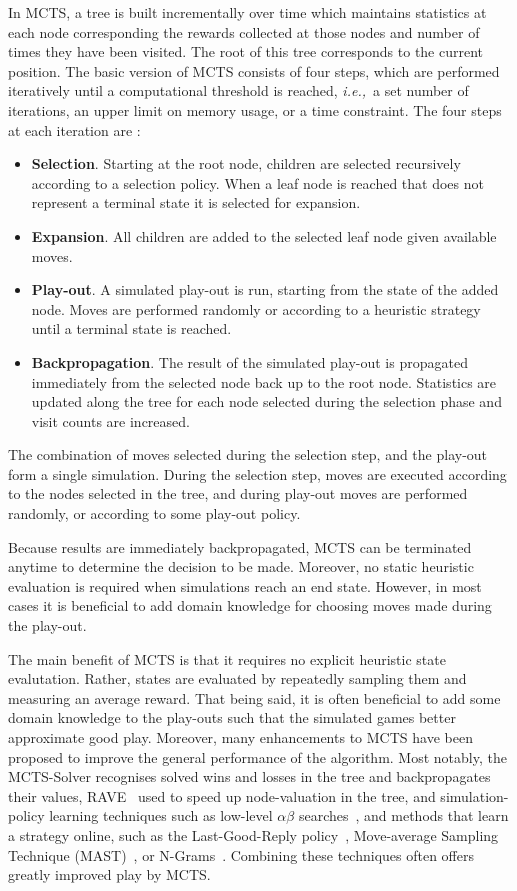 \documentclass{kecsmstr}
\newcommand{\ie}{{\it i.e.,}~}
\begin{document}
In MCTS, a tree is built incrementally over time which maintains statistics at each node corresponding the rewards collected at those nodes and number of times  they have been visited. The root of this tree corresponds to the current position. The basic version of MCTS consists of four steps, which are performed iteratively until a computational threshold is reached, \ie a set number of iterations, an upper limit on memory usage, or a time constraint. The four steps at each iteration are :
\begin{itemize}
\item {\bf Selection}. Starting at the root node, children are selected recursively according to a selection policy. When a leaf node is reached that does not represent a terminal state it is selected for expansion.
\item {\bf Expansion}. All children are added to the selected leaf node given available moves.
\item {\bf Play-out}. A simulated play-out is run, starting from the state of the added node. Moves are performed randomly or according to a heuristic strategy until a terminal state is reached.
\item {\bf Backpropagation}. The result of the simulated play-out is propagated immediately from the selected node back up to the root node. Statistics are updated along the tree for each node selected during the selection phase and visit counts are increased.
\end{itemize}
The combination of moves selected during the selection step, and the play-out form a single simulation. During the selection step, moves are executed according to the nodes selected in the tree, and during play-out moves are performed randomly, or according to some play-out policy.

Because results are immediately backpropagated, MCTS can be terminated anytime to determine the decision to be made. Moreover, no static heuristic evaluation is required when simulations reach an end state. However, in most cases it is beneficial to add domain knowledge for choosing moves made during the play-out.

The main benefit of MCTS is that it requires no explicit heuristic state evalutation. Rather, states are evaluated by repeatedly sampling them and measuring an average reward. That being said, it is often beneficial to add some domain knowledge to the play-outs such that the simulated games better approximate good play. Moreover, many enhancements to MCTS have been proposed to improve the general performance of the algorithm. Most notably, the MCTS-Solver  recognises solved wins and losses in the tree and backpropagates their values, RAVE~ used to speed up node-valuation in the tree, and simulation-policy learning techniques such as low-level $\alpha\beta$ searches~, and methods that learn a strategy online, such as the Last-Good-Reply policy~, Move-average Sampling Technique (MAST)~, or N-Grams~. Combining these techniques often offers greatly improved play by MCTS.
\end{document}

